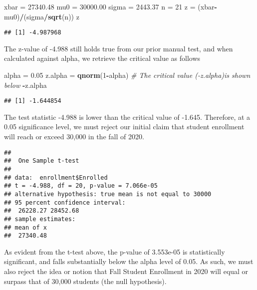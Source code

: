 \documentclass[
]{article}
\newenvironment{Shaded}{\begin{snugshade}}{\end{snugshade}}
\newcommand{\CommentTok}[1]{\textcolor[rgb]{0.56,0.35,0.01}{\textit{#1}}}
\newcommand{\DataTypeTok}[1]{\textcolor[rgb]{0.13,0.29,0.53}{#1}}
\newcommand{\DecValTok}[1]{\textcolor[rgb]{0.00,0.00,0.81}{#1}}
\newcommand{\FloatTok}[1]{\textcolor[rgb]{0.00,0.00,0.81}{#1}}
\newcommand{\KeywordTok}[1]{\textcolor[rgb]{0.13,0.29,0.53}{\textbf{#1}}}
\newcommand{\NormalTok}[1]{#1}
\newcommand{\OperatorTok}[1]{\textcolor[rgb]{0.81,0.36,0.00}{\textbf{#1}}}
\newcommand{\StringTok}[1]{\textcolor[rgb]{0.31,0.60,0.02}{#1}}
\begin{document}
\begin{Shaded}
\begin{Highlighting}[]
\NormalTok{xbar =}\StringTok{ }\FloatTok{27340.48}
\NormalTok{mu0 =}\StringTok{ }\FloatTok{30000.00}
\NormalTok{sigma =}\StringTok{ }\FloatTok{2443.37}
\NormalTok{n =}\StringTok{ }\DecValTok{21}
\NormalTok{z =}\StringTok{ }\NormalTok{(xbar}\OperatorTok{-}\NormalTok{mu0)}\OperatorTok{/}\NormalTok{(sigma}\OperatorTok{/}\KeywordTok{sqrt}\NormalTok{(n))}
\NormalTok{z}
\end{Highlighting}
\end{Shaded}

\begin{verbatim}
## [1] -4.987968
\end{verbatim}

The z-value of -4.988 still holds true from our prior manual test, and
when calculated against alpha, we retrieve the critical value as follows

\begin{Shaded}
\begin{Highlighting}[]
\NormalTok{alpha =}\StringTok{ }\FloatTok{0.05}
\NormalTok{z.alpha =}\StringTok{ }\KeywordTok{qnorm}\NormalTok{(}\DecValTok{1}\OperatorTok{-}\NormalTok{alpha)}
\CommentTok{# The critical value (-z.alpha)is shown below}
\OperatorTok{-}\NormalTok{z.alpha}
\end{Highlighting}
\end{Shaded}

\begin{verbatim}
## [1] -1.644854
\end{verbatim}

The test statistic -4.988 is lower than the critical value of -1.645.
Therefore, at a 0.05 significance level, we must reject our initial
claim that student enrollment will reach or exceed 30,000 in the fall of
2020.

\begin{Shaded}
\end{Shaded}

\begin{verbatim}
## 
##  One Sample t-test
## 
## data:  enrollment$Enrolled
## t = -4.988, df = 20, p-value = 7.066e-05
## alternative hypothesis: true mean is not equal to 30000
## 95 percent confidence interval:
##  26228.27 28452.68
## sample estimates:
## mean of x 
##  27340.48
\end{verbatim}

As evident from the t-test above, the p-value of 3.553e-05 is
statistically significant, and falls substantially below the alpha level
of 0.05. As such, we must also reject the idea or notion that Fall
Student Enrollment in 2020 will equal or surpass that of 30,000 students
(the null hypothesis).
\end{document}
